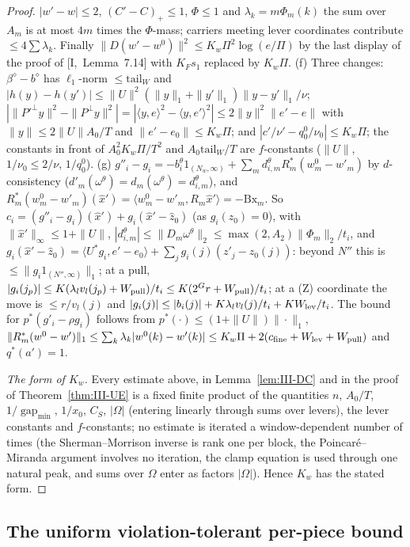 \documentclass[10pt]{amsart}
\theoremstyle{definition}
\theoremstyle{remark}
\newcommand{\gap}{\operatorname{gap}}
\newcommand{\zh}{\hat z}
\newcommand{\ip}[2]{\langle #1,#2\rangle}
\begin{document}
\begin{proof}
$|w'-w|\le2$, $(C'-C)_+\le1$, $\Phi\le1$ and $\lambda_k=m\Phi_m(k)$ the sum over
$A_m$ is at most $4m$ times the $\Phi$-mass; carriers meeting lever coordinates
contribute $\le4\sum\lambda_k$.  Finally $\|D(w'-w^0)\|^2\le K_w\Pi^2\log(e/\Pi)$
by the last display of the proof of [I,~Lemma~7.14] with $K_Fs_1$ replaced by
$K_w\Pi$.
(f) Three changes: $\beta^\diamond-b^\diamond$ has $\ell_1$-norm $\le
\mathrm{tail}_W$ and $|h(y)-h(y')|\le\|U\|^2(\|y\|_1+\|y'\|_1)\|y-y'\|_1/\nu$;
$|\|P'^\perp y\|^2-\|P^\perp y\|^2|=|\ip ye^2-\ip y{e'}^2|\le2\|y\|^2\|e'-e\|$
with $\|y\|\le2\|U\|A_0/T$ and $\|e'-e_0\|\le K_w\Pi$; and $|c'/\nu'-q^0_0/\nu_0|\le K_w\Pi$; the constants in front of $A_0^2K_w\Pi/T^2$ and $A_0\mathrm{tail}_W/T$ are $f$-constants ($\|U\|$, $1/\nu_0\le2/\nu$, $1/q^0_0$).
(g) $g''_i-g_i=-b^\theta_i1_{(N_w,\infty)}+\sum_md^\theta_{i,m}R_m^*(w^0_m-w'_m)$
by $d$-consistency ($d'_m(\omega^\theta)=d_m(\omega^\theta)=d^\theta_{i,m}$), and
$R_m^*(w^0_m-w'_m)(\hat x')=\ip{w^0_m-w'_m}{R_m\hat x'}=-\mathrm{Bx}_m$.  So
$c_i=(g''_i-g_i)(\hat x')+g_i(\hat x'-\zh_0)$ (as $g_i(\zh_0)=0$), with
$\|\hat x'\|_\infty\le1+\|U\|$, $|d^\theta_{i,m}|\le\|D_m\omega^\theta\|_2\le
\max(2,A_2)\|\Phi_m\|_2/t_i$, and $g_i(\hat x'-\zh_0)=\ip{U^*g_i}{e'-e_0}+
\sum_j g_i(j)(z'_j-z_0(j))$: beyond $N''$ this is $\le\|g_i1_{(N'',\infty)}\|_1$;
at a pull, $|g_i(j_p)|\le K(\lambda_lv_l(j_p)+W_{\rm pull})/t_i\le
K(2^Gr+W_{\rm pull})/t_i$; at a (Z) coordinate the move is $\le r/v_l(j)$ and
$|g_i(j)|\le|b_i(j)|+K\lambda_lv_l(j)/t_i+K W_{\rm lev}/t_i$.  The bound for
$p^*(g'_i-\rho g_i)$ follows from $p^*(\cdot)\le(1+\|U\|)\|\cdot\|_1$,
$\|R_m^*(w^0-w')\|_1\le\sum_k\lambda_k|w^0(k)-w'(k)|\le K_w\Pi+2(c_{\rm fine}+
W_{\rm lev}+W_{\rm pull})$ and $q^*(a')=1$.

\emph{The form of $K_w$.}  Every estimate above, in Lemma~\ref{lem:III-DC} and in
the proof of Theorem~\ref{thm:III-UE} is a fixed finite product of the
quantities $n$, $A_0/T$, $1/\gap_{\min}$, $1/x_0$, $C_S$, $|\Omega|$ (entering
linearly through sums over levers), the lever constants and $f$-constants; no
estimate is iterated a window-dependent number of times (the Sherman--Morrison
inverse is rank one per block, the Poincar\'e--Miranda argument involves no
iteration, the clamp equation is used through one natural peak, and sums over
$\Omega$ enter as factors $|\Omega|$).  Hence $K_w$ has the stated form.
\end{proof}

\subsection{The uniform violation-tolerant per-piece bound}\label{subsec:III-UEthm}
\end{document}
